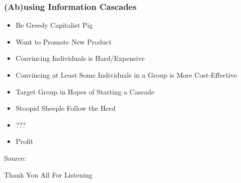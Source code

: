 \documentclass[slidestop,usenames,dvipsnames]{beamer}
\newcommand{\fitem}{\pause\vfill\item}
\newcommand{\source}[1]{\vfill\hfill Source: \cite{#1}}
\begin{document}
\begin{frame}
    \frametitle{(Ab)using Information Cascades}
    \begin{itemize}
        \fitem Be Greedy Capitalist Pig
        \fitem Want to Promote New Product
        \fitem Convincing Individuals is Hard/Expensive
        \fitem Convincing at Least Some Individuals in a Group is More Cost-Effective
        \fitem Target Group in Hopes of Starting a Cascade
        \fitem Stoopid Sheeple Follow the Herd
        \fitem ???
        \fitem Profit
    \end{itemize}
    \source{eftekhar2013information}
    \vfill
\end{frame}




\begin{frame}
    \vfill
    \begin{center}
        {\Huge Thank You All For Listening}\
    \end{center}
\end{frame}



\end{document}
